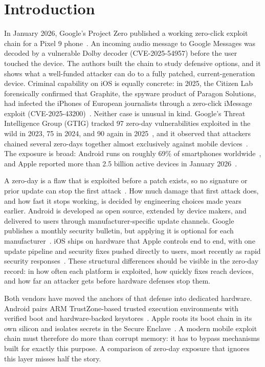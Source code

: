 \documentclass[conference,a4paper]{IEEEtran}
\begin{document}
\section{Introduction}
In January 2026, Google's Project Zero published a working zero-click exploit
chain for a Pixel 9 phone~\cite{silvanovich2026pixel}. An incoming audio
message to Google Messages was decoded by a vulnerable Dolby decoder
(CVE-2025-54957) before the user touched the device. The authors built the
chain to study defensive options, and it shows what a well-funded attacker
can do to a fully patched, current-generation device. Criminal capability on
iOS is equally concrete: in 2025, the Citizen Lab forensically confirmed that
Graphite, the spyware product of Paragon Solutions, had infected the iPhones
of European journalists through a zero-click iMessage exploit
(CVE-2025-43200)~\cite{marczak2025graphite}. Neither case is unusual in kind.
Google's Threat Intelligence Group (GTIG) tracked 97 zero-day vulnerabilities
exploited in the wild in 2023, 75 in 2024, and 90 again in
2025~\cite{gtig2023review, charrier2025zeroday, gtig2026review}, and it observed that
attackers chained several zero-days together almost exclusively against
mobile devices~\cite{charrier2025zeroday}. The exposure is broad: Android
runs on roughly 69\% of smartphones worldwide~\cite{statcounter2026}, and
Apple reported more than 2.5 billion active devices in January
2026~\cite{apple2026devices}.

A zero-day is a flaw that is exploited before a patch exists, so no signature
or prior update can stop the first attack~\cite{nist2022zeroday}. How much
damage that first attack does, and how fast it stops working, is decided by
engineering choices made years earlier. Android is developed as open source,
extended by device makers, and delivered to users through
manufacturer-specific update channels. Google publishes a monthly security
bulletin, but applying it is optional for each
manufacturer~\cite{aospbulletin2026}. iOS ships on hardware that Apple
controls end to end, with one update pipeline and security fixes pushed
directly to users, most recently as rapid security
responses~\cite{applesecurity2026, applersr2026}. These structural
differences should be visible in the zero-day record: in how often each
platform is exploited, how quickly fixes reach devices, and how far an
attacker gets before hardware defenses stop them.

Both vendors have moved the anchors of that defense into dedicated hardware.
Android pairs ARM TrustZone-based trusted execution environments with
verified boot and hardware-backed keystores~\cite{aospverifiedboot2026,
aospkeystore2026}. Apple roots its boot chain in its own silicon and isolates
secrets in the Secure Enclave~\cite{applesecurity2026}. A modern mobile
exploit chain must therefore do more than corrupt memory: it has to bypass
mechanisms built for exactly this purpose. A comparison of zero-day exposure
that ignores this layer misses half the story.
\end{document}
